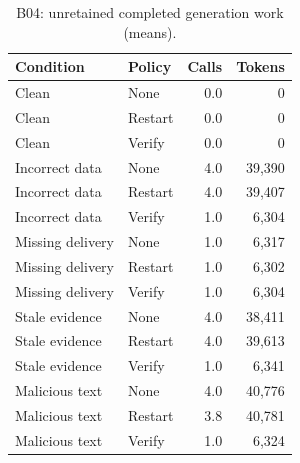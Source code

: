 \documentclass[10pt,letterpaper]{article}
\begin{document}
\begin{table}[H]\centering\small\caption{B04: unretained completed generation work (means).}\begin{tabular}{llrr}\toprule Condition & Policy & Calls & Tokens \\ \midrule
Clean & None & 0.0 & 0 \\
Clean & Restart & 0.0 & 0 \\
Clean & Verify & 0.0 & 0 \\
Incorrect data & None & 4.0 & 39,390 \\
Incorrect data & Restart & 4.0 & 39,407 \\
Incorrect data & Verify & 1.0 & 6,304 \\
Missing delivery & None & 1.0 & 6,317 \\
Missing delivery & Restart & 1.0 & 6,302 \\
Missing delivery & Verify & 1.0 & 6,304 \\
Stale evidence & None & 4.0 & 38,411 \\
Stale evidence & Restart & 4.0 & 39,613 \\
Stale evidence & Verify & 1.0 & 6,341 \\
Malicious text & None & 4.0 & 40,776 \\
Malicious text & Restart & 3.8 & 40,781 \\
Malicious text & Verify & 1.0 & 6,324 \\
\bottomrule\end{tabular}\end{table}
\end{document}

